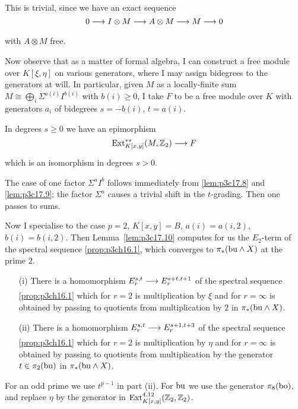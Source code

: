 \documentclass[../main]{subfiles}
\begin{document}
This is trivial, since we have an exact sequence \[0 \lar{} I \otimes M \lar{} A \otimes M \lar{} M \lar{} 0\] with $A \otimes M$ free.

Now observe that as a matter of formal algebra, I can construct a free module over $K[\xi, \eta]$ on various generators, where I may assign bidegrees to the generators at will. In particular, given $M$ as a locally-finite sum $M \cong\displaystyle \bigoplus_i \Sigma^{a(i)} I^{b(i)}$ with $b(i) \ge 0$, I take $F$ to be a free module over $K$ with generators $a_i$ of bidegrees $s = -b(i)$, $t = a(i)$.

\begin{lemma}
\label{lem:p3c17.10}
In degrees $s \ge 0$ we have an epimorphism \[\mathrm{Ext}_{K[x, y]}^{\ast \ast}(M, \bbZ_2) \lar{} F\] which is an isomorphism in degrees $s > 0$. 
\end{lemma}

The case of one factor $\Sigma^a I^b$ follows immediately from \ref{lem:p3c17.8} and \ref{lem:p3c17.9}; the factor $\Sigma^a$ causes a trivial shift in the $t$-grading. Then one passes to sums.

Now I specialise to the case $p = 2$, $K[x, y] = B$, $a(i) = a(i, 2)$, $b(i) = b(i, 2)$. Then Lemma~\ref{lem:p3c17.10} computes for us the $E_2$-term of the spectral sequence \ref{prop:p3ch16.1}, which converges to $\pi_\ast(\mathrm{bu} \wedge X)$ at the prime $2$. 

\begin{lemma}
\label{lem:p3c17.11}
\begin{enumerate}
    \item[(i)] There is a homomorphism $E_r^{s, t} \lar{} E_r^{s + t, t + 1}$ of the spectral sequence \ref{prop:p3ch16.1} which for $r = 2$ is multiplication by $\xi$ and for $r = \infty$ is obtained by passing to quotients from multiplication by $2$ in $\pi_\ast(\mathrm{bu} \wedge X)$.
    \item[(ii)] There is a homomorphism $E_r^{s, t} \lar{} E_r^{s + 1, t + 3}$ of the spectral sequence \ref{prop:p3ch16.1} which for $r = 2$ is multiplication by $\eta$ and for $r = \infty$ is obtained by passing to quotients from multiplication by the generator $t \in \pi_2(\mathrm{bu})$ in $\pi_\ast(\mathrm{bu} \wedge X)$.
\end{enumerate}
\end{lemma}

For an odd prime we use $t^{p - 1}$ in part (ii). For $\mathrm{bu}$ we use the generator $\pi_8(\mathrm{bo})$, and replace $\eta$ by the generator in $\mathrm{Ext}_{K[x, y]}^{4, 12}(\mathbb{Z}_2, \mathbb{Z}_2)$. 
\end{document}
